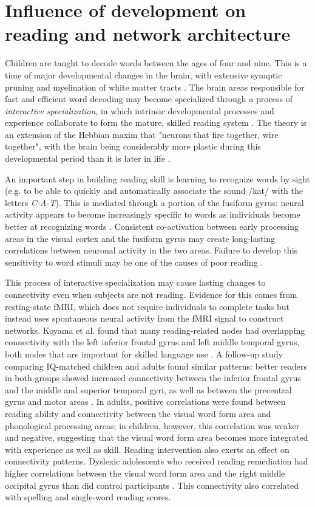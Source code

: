 \section{Influence of development on reading and network architecture}

Children are taught to decode words between the ages of four and nine. This is a time of major developmental changes in the brain, with extensive synaptic pruning and myelination of white matter tracts \cite{Wandell2013}. The brain areas responsible for fast and efficient word decoding may become specialized through a process of \textit{interactive specialization}, in which intrinsic developmental processes and experience collaborate to form the mature, skilled reading system \cite{Johnson2011, Klingberg2014}. The theory is an extension of the Hebbian maxim that "neurons that fire together, wire together", with the brain being considerably more plastic during this developmental period than it is later in life \cite{Hebb1949}.

An important step in building reading skill is learning to recognize words by sight (e.g. to be able to quickly and automatically associate the sound /kat/ with the letters \textit{C-A-T}). This is mediated through a portion of the fusiform gyrus: neural activity appears to become increasingly specific to words as individuals become better at recognizing words \cite{Mccandliss2003, Schlaggar2007}. Consistent co-activation between early processing areas in the visual cortex and the fusiform gyrus may create long-lasting correlations between neuronal activity in the two areas. Failure to develop this sensitivity to word stimuli may be one of the causes of poor reading \cite{He2013}.  

This process of interactive specialization may cause lasting changes to connectivity even when subjects are not reading. Evidence for this comes from resting-state fMRI, which does not require individuals to complete tasks but instead uses spontaneous neural activity from the fMRI signal to construct networks. Koyama et al. found that many reading-related nodes had overlapping connectivity with the left inferior frontal gyrus and left middle temporal gyrus, both nodes that are important for skilled language use \cite{Koyama2010}. A follow-up study comparing IQ-matched children and adults found similar patterns: better readers in both groups showed increased connectivity between the inferior frontal gyrus and the middle and superior temporal gyri, as well as between the precentral gyrus and motor areas \cite{Koyama2011}. In adults, positive correlations were found between reading ability and connectivity between the visual word form area and phonological processing areas; in children, however, this correlation was weaker and negative, suggesting that the visual word form area becomes more integrated with experience as well as skill. Reading intervention also exerts an effect on connectivity patterns. Dyslexic adolescents who received reading remediation had higher correlations between the visual word form area and the right middle occipital gyrus than did control participants \cite{Koyama2013}. This connectivity also correlated with spelling and single-word reading scores.

